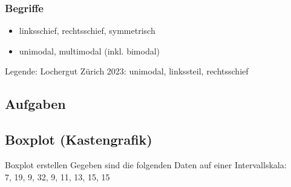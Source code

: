 \subsubsection{Begriffe}
\begin{itemize}
\item linksschief, rechtsschief, symmetrisch
\item unimodal, multimodal (inkl. bimodal)
\end{itemize}

\begin{center}\small{Legende: Lochergut Zürich 2023: unimodal,
    linkssteil, rechtsschief}\end{center}


\newpage

\subsection*{Aufgaben}

  
\newpage

\subsection{Boxplot (Kastengrafik)}

\begin{beispiel}{Boxplot erstellen}{}
  Gegeben sind die folgenden Daten auf einer Intervallskala:\\
  7, 19, 9, 32, 9, 11, 13, 15, 15
\end{beispiel}

